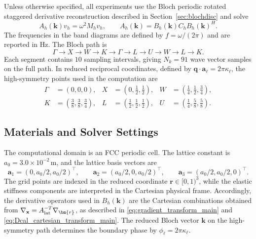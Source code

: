\documentclass[11pt,oneside]{article}
\numberwithin{equation}{section}
\theoremstyle{plain}
\theoremstyle{remark}
\newcommand{\bk}{\bm{k}}
\newcommand{\bq}{\bm{q}}
\newcommand{\br}{\bm{r}}
\newcommand{\ba}[1]{\bm{a}_{#1}}
\begin{document}
Unless otherwise specified, all experiments use the Bloch periodic rotated staggered derivative reconstruction described in Section~\ref{sec:blochdisc} and solve
\begin{equation}
\label{eq:num_full_problem}
A_h(\bk)v_h=\omega^2 M_hv_h,
\qquad
A_h(\bk)=B_h(\bk)C_hB_h(\bk)^H .
\end{equation}
The frequencies in the band diagrams are defined by \(f=\omega/(2\pi)\) and are reported in Hz. The Bloch path is
\[
\Gamma\to X\to W\to K\to\Gamma\to L\to U\to W\to L\to K .
\]
Each segment contains \(10\) sampling intervals, giving \(N_k=91\) wave vector samples on the full path. In reduced reciprocal coordinates, defined by \(\bq\cdot\ba{\ell}=2\pi\kappa_\ell\), the high-symmetry points used in the computation are
\begin{equation}
\label{eq:fcc_high_symmetry_points}
\begin{aligned}
\Gamma&=(0,0,0),
&X&=\left(0,\frac12,\frac12\right),
&W&=\left(\frac14,\frac12,\frac34\right),\\
K&=\left(\frac38,\frac38,\frac34\right),
&L&=\left(\frac12,\frac12,\frac12\right),
&U&=\left(\frac14,\frac58,\frac58\right).
\end{aligned}
\end{equation}

\subsection{Materials and Solver Settings}
\label{subsec:num_setting}

The computational domain is an FCC periodic cell. The lattice constant is
\(a_0=3.0\times10^{-2}\,\mathrm{m}\), and the lattice basis vectors are
\begin{equation}
\label{eq:num_lattice_vectors}
\bm a_1=(0,a_0/2,a_0/2)^\top,\qquad
\bm a_2=(a_0/2,0,a_0/2)^\top,\qquad
\bm a_3=(a_0/2,a_0/2,0)^\top .
\end{equation}
The grid points are indexed in the reduced coordinate \(\br\in[0,1)^3\), while the elastic stiffness components are interpreted in the Cartesian physical frame. Accordingly, the derivative operators used in \(B_h(\bk)\) are the Cartesian combinations obtained from \(\nabla_{\mathbf x}=A_{\rm lat}^{-T}\nabla_{\br}\), as described in \eqref{eq:gradient_transform_main} and \eqref{eq:Dcal_cartesian_transform_main}. The reduced Bloch vector \(\bk\) on the high-symmetry path determines the boundary phase by \(\phi_\ell=2\pi\kappa_\ell\).
\end{document}

